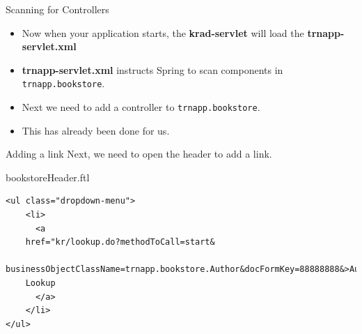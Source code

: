 \documentclass[xcolor=dvipsnames,14pt,professionalfonts]{beamer}
\begin{document}
\begin{frame}{Scanning for Controllers}
  \begin{itemize}
    \item Now when your application starts, the \textbf{krad-servlet}
      will load the \textbf{trnapp-servlet.xml}
    \item \textbf{trnapp-servlet.xml} instructs Spring to scan
      components in \texttt{trnapp.bookstore}.
    \item Next we need to add a controller to
      \texttt{trnapp.bookstore}.
      \item This has already been done for us.
  \end{itemize}
\end{frame}

\begin{frame}{Adding a link}
  Next, we need to open the header to add a link.
\end{frame}

\begin{frame}[fragile]{bookstoreHeader.ftl}
    \begin{verbatim}
<ul class="dropdown-menu">
    <li>
      <a
    href="kr/lookup.do?methodToCall=start&
    businessObjectClassName=trnapp.bookstore.Author&docFormKey=88888888&>Author
    Lookup
      </a>
    </li> 
</ul>
    \end{verbatim}
\end{frame}
\end{document}
